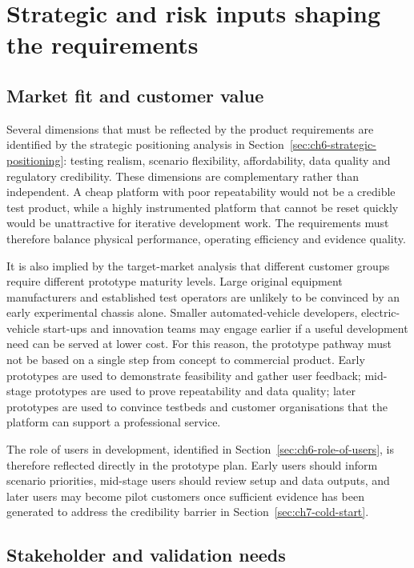 \section{Strategic and risk inputs shaping the requirements}
\label{sec:ch8_strategic_risk_inputs}

\subsection{Market fit and customer value}
\label{sec:ch8_market_fit_customer_value}

Several dimensions that must be reflected by the product requirements are identified by the strategic positioning analysis in Section~\ref{sec:ch6-strategic-positioning}: testing realism, scenario flexibility, affordability, data quality and regulatory credibility. These dimensions are complementary rather than independent. A cheap platform with poor repeatability would not be a credible test product, while a highly instrumented platform that cannot be reset quickly would be unattractive for iterative development work. The requirements must therefore balance physical performance, operating efficiency and evidence quality.

It is also implied by the target-market analysis that different customer groups require different prototype maturity levels. Large original equipment manufacturers and established test operators are unlikely to be convinced by an early experimental chassis alone. Smaller automated-vehicle developers, electric-vehicle start-ups and innovation teams may engage earlier if a useful development need can be served at lower cost. For this reason, the prototype pathway must not be based on a single step from concept to commercial product. Early prototypes are used to demonstrate feasibility and gather user feedback; mid-stage prototypes are used to prove repeatability and data quality; later prototypes are used to convince testbeds and customer organisations that the platform can support a professional service.

The role of users in development, identified in Section~\ref{sec:ch6-role-of-users}, is therefore reflected directly in the prototype plan. Early users should inform scenario priorities, mid-stage users should review setup and data outputs, and later users may become pilot customers once sufficient evidence has been generated to address the credibility barrier in Section~\ref{sec:ch7-cold-start}.

\subsection{Stakeholder and validation needs}
\label{sec:ch8_stakeholder_validation_needs}

